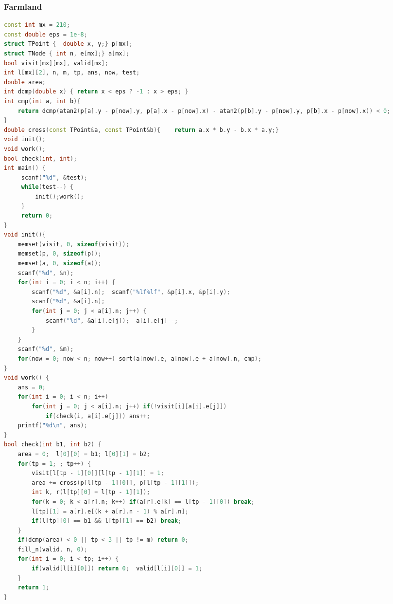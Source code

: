 \documentclass[landscape,a4paper]{article}
\begin{document}
\begin{spacing}{0.3}
\begin{multicols}{3}
\subsubsection{Farmland}
\begin{lstlisting}[language=C++]
const int mx = 210;
const double eps = 1e-8;
struct TPoint {  double x, y;} p[mx];
struct TNode { int n, e[mx];} a[mx];
bool visit[mx][mx], valid[mx];
int l[mx][2], n, m, tp, ans, now, test;
double area;
int dcmp(double x) { return x < eps ? -1 : x > eps; }
int cmp(int a, int b){
    return dcmp(atan2(p[a].y - p[now].y, p[a].x - p[now].x) - atan2(p[b].y - p[now].y, p[b].x - p[now].x)) < 0;
}
double cross(const TPoint&a, const TPoint&b){    return a.x * b.y - b.x * a.y;}
void init();
void work();
bool check(int, int);
int main() {
     scanf("%d", &test);
     while(test--) {
         init();work();
     }
     return 0;
}
void init(){
    memset(visit, 0, sizeof(visit));
    memset(p, 0, sizeof(p));
    memset(a, 0, sizeof(a));
    scanf("%d", &n);
    for(int i = 0; i < n; i++) {
        scanf("%d", &a[i].n);  scanf("%lf%lf", &p[i].x, &p[i].y);
        scanf("%d", &a[i].n);
        for(int j = 0; j < a[i].n; j++) {
            scanf("%d", &a[i].e[j]);  a[i].e[j]--;
        }
    }
    scanf("%d", &m);
    for(now = 0; now < n; now++) sort(a[now].e, a[now].e + a[now].n, cmp);
}
void work() {
    ans = 0;
    for(int i = 0; i < n; i++)
        for(int j = 0; j < a[i].n; j++) if(!visit[i][a[i].e[j]])
            if(check(i, a[i].e[j])) ans++;
    printf("%d\n", ans);
}
bool check(int b1, int b2) {
    area = 0;  l[0][0] = b1; l[0][1] = b2;
    for(tp = 1; ; tp++) {
        visit[l[tp - 1][0]][l[tp - 1][1]] = 1;
        area += cross(p[l[tp - 1][0]], p[l[tp - 1][1]]);
        int k, r(l[tp][0] = l[tp - 1][1]);
        for(k = 0; k < a[r].n; k++) if(a[r].e[k] == l[tp - 1][0]) break;
        l[tp][1] = a[r].e[(k + a[r].n - 1) % a[r].n];
        if(l[tp][0] == b1 && l[tp][1] == b2) break;
    }
    if(dcmp(area) < 0 || tp < 3 || tp != m) return 0;
    fill_n(valid, n, 0);
    for(int i = 0; i < tp; i++) {
        if(valid[l[i][0]]) return 0;  valid[l[i][0]] = 1;
    }
    return 1;
}
\end{lstlisting}

\end{multicols}
\end{spacing}
\end{document}
